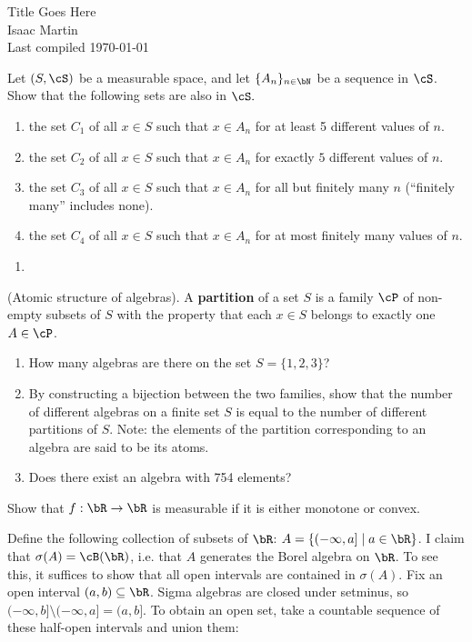


\pagestyle{empty}
	\LARGE
\begin{center}
	Title Goes Here \\
	\Large
	Isaac Martin \\
    Last compiled \today
\end{center}
\normalsize
\vspace{-2mm}
\hru
{}
\begin{homework}[e]
	\prob Let $(S,\cS)$ be a measurable space, and let $\{A_n\}_{n\in \bN}$ be a sequence in $\cS$. Show that the following sets are also in $\cS.$
	\begin{enumerate}[(1)]
		\item the set $C_1$ of all $x \in S$ such that $x \in A_n$ for at least 5 different values of $n$.
		\item the set $C_2$ of all $x \in S$ such that $x \in A_n$ for exactly $5$ different values of $n$.
		\item the set $C_3$ of all $x \in S$ such that $x \in A_n$ for all but finitely many $n$ (``finitely many'' includes none).
		\item the set $C_4$ of all $x \in S$ such that $x \in A_n$ for at most finitely many values of $n$.
	\end{enumerate}
	\begin{prf}
		\begin{enumerate}[(1)]
			\item 
		\end{enumerate}
	\end{prf}
	\prob (Atomic structure of algebras). A \textbf{partition} of a set $S$ is a family $\cP$ of non-empty subsets of $S$ with the property that each $x \in S$ belongs to exactly one $A \in \cP$.
	\begin{enumerate}[(1)]
		\item How many algebras are there on the set $S = \{1,2,3\}$?
		\item By constructing a bijection between the two families, show that the number of different algebras on a finite set $S$ is equal to the number of different partitions of $S$. Note: the elements of the partition corresponding to an algebra are said to be its atoms.
		\item Does there exist an algebra with 754 elements?
	\end{enumerate}
	\prob Show that $f: \bR\to \bR$ is measurable if it is either monotone or convex.
	\begin{prf}
		Define the following collection of subsets of $\bR$: $A = \{(-\infty,a] \mid a \in \bR\}$. I claim that $\sigma(A) = \cB(\bR)$, i.e. that $A$ generates the Borel algebra on $\bR$. To see this, it suffices to show that all open intervals are contained in $\sigma(A)$. Fix an open interval $(a,b) \subseteq \bR$. Sigma algebras are closed under setminus, so $(-\infty, b] \setminus (-\infty,a] = (a,b]$. To obtain an open set, take a countable sequence of these half-open intervals and union them:

\end{prf}
\end{homework}
